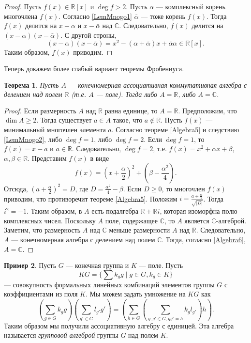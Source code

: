 \documentclass[12pt, titlepage, oneside]{amsbook}
\newcommand{\RR}{\mathbb{R}}
\newcommand{\CC}{\mathbb{C}}
\newtheorem{theorem}{Теорема}[chapter]
\theoremstyle{definition}
\newtheorem{example}[theorem]{Пример}
\theoremstyle{remark}
\begin{document}
\begin{proof}
	Пусть $f(x)\in\RR[x]$ и $\deg f>2$. Пусть $\alpha$ --- комплексный корень многочлена $f(x)$. Согласно \ref{LemMnogo1} $\bar{\alpha}$ --- тоже корень $f(x)$. Тогда $f(x)$ делится на $x-\alpha$ и $x-\bar{\alpha}$ над $\CC$. Следовательно, $f(x)$ делится на $(x-\alpha)(x-\bar{\alpha})$. С другой строны, $$(x-\alpha)(x-\bar{\alpha})=x^2-(\alpha+\bar{\alpha})x+\bar{\alpha}\alpha\in\RR[x].$$ Таким образом, $f(x)$ приводим.
\end{proof}

Теперь докажем более слабый вариант теоремы Фробениуса.

\begin{theorem}
	\label{Algebra8} Пусть $A$ --- конечномерная ассоциативная коммутативная алгебра с делением над полем $\RR$ (т.е. $A$ --- поле). Тогда либо $A=\RR$, либо $A=\CC$.
\end{theorem}

\begin{proof}
	Если размерность $A$ над $\RR$ равна единице, то $A=\RR$. Предположим, что $\dim A\geq 2$. Тогда существует $a\in A$ такое, что $a\not\in\RR$. Пусть $f(x)$ --- минимальный многочлен элемента $a$. Согласно теореме \ref{Algebra5} и следствию \ref{LemMnogo2}, либо $\deg f=1$, либо $\deg f=2$. Если $\deg f=1$, то $f(x)=x-a$ и $a\in\RR$. Следовательно, $\deg f=2$, т.е. $f(x)=x^2+\alpha x+\beta$, $\alpha,\beta\in\RR$. Представим $f(x)$ в виде $$f(x)=(x+\frac{\alpha}{2})^2+(\beta-\frac{\alpha^2}{4}).$$ Отсюда, $(a+\frac{\alpha}{2})^2=D$, где $D=\frac{\alpha^2}{4}-\beta$. Если $D\geq 0$, то многочлен $f(x)$ приводим, что противоречит теореме \ref{Algebra5}. Положим $i=\frac{a+\frac{\alpha}{2}}{\sqrt{|D|}}$. Тогда $i^2=-1$. Таким образом, в $A$ есть подалгебра $\RR+\RR i$, которая изоморфна полю комплексных чисел. Поскольку $A$ поле, содержащее $\CC$, то $A$ является $\CC$-алгеброй. Заметим, что размерность $A$ над $\CC$ меньше размерности $A$ над $\RR$. Следовательно, $A$ --- конечномерная алгебра с делением над полем $\CC$. Тогда, согласно \ref{Algebra6}, $A=\CC$.
\end{proof}

\begin{example}
	Пусть $G$ --- конечная группа и $K$ --- поле. Пусть $$KG=\{\sum k_g g\mid g\in G, k_g\in K\}$$ --- совокупность формальных линейных комбинаций элементов группы $G$ с коэффициентами из поля $K$. Мы можем задать умножение на $KG$ как $$\left(\sum\limits_{g\in G} k_g g\right)\left(\sum\limits_{g'\in G} l_{g'} g'\right)=\left(\sum\limits_{h\in G} \left(\sum\limits_{g,g'\in G, gg'=h}k_g l_{g'}\right)h\right).$$ Таким образом мы получили ассоциативную алгебру с единицей. Эта алгебра называется \emph{групповой алгеброй} группы $G$ над полем $K$.
\end{example}
\end{document}
